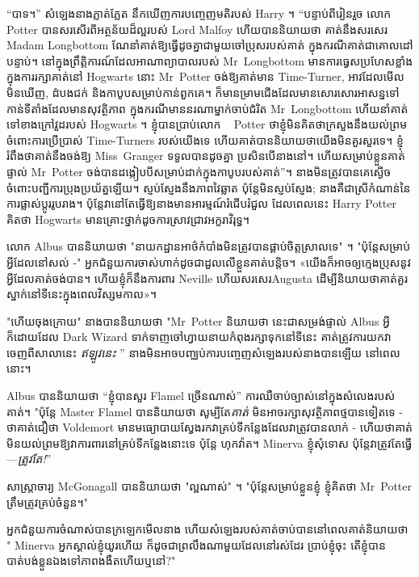“បាទ។” សំឡេង​នាង​ភ្លាត់​ភ្លែត នឹក​ឃើញ​ការ​បញ្ចេញ​មតិ​របស់ Harry ។ “បន្ទាប់ពីរៀនរួច លោក Potter បានសរសើរពីអត្ថន័យដ៏ល្អរបស់ Lord Malfoy ហើយបាននិយាយថា គាត់នឹងសរសេរ Madam Longbottom ណែនាំគាត់ឱ្យធ្វើដូចគ្នាជាមួយចៅប្រុសរបស់គាត់ ក្នុងករណីគាត់ជាគោលដៅបន្ទាប់។ នៅក្នុងព្រឹត្តិការណ៍ដែលអាណាព្យាបាលរបស់ Mr~Longbottom មានការធ្វេសប្រហែសខ្លាំងក្នុងការរក្សាគាត់នៅ Hogwarts នោះ Mr~Potter ចង់ឱ្យគាត់មាន Time-Turner, អាវដែលមើលមិនឃើញ, ដំបងជក់ និងកាបូបសម្រាប់កាន់ពួកគេ។ ក៏មានម្រាមជើងដែលមានសោរសោរអាសន្នទៅកាន់ទីតាំងដែលមានសុវត្ថិភាព ក្នុងករណីមាននរណាម្នាក់ចាប់ជំរិត Mr~Longbottom ហើយនាំគាត់ទៅខាងក្រៅវួដរបស់ Hogwarts ។ ខ្ញុំបានប្រាប់លោក ~ Potter ថាខ្ញុំមិនគិតថាក្រសួងនឹងយល់ព្រមចំពោះការប្រើប្រាស់ Time-Turners របស់យើងទេ ហើយគាត់បាននិយាយថាយើងមិនគួរសួរទេ។ ខ្ញុំរំពឹងថាគាត់នឹងចង់ឱ្យ Miss~Granger ទទួលបានដូចគ្នា ប្រសិនបើនាងនៅ។ ហើយសម្រាប់ខ្លួនគាត់ផ្ទាល់ Mr~Potter ចង់បានដង្កៀបបីសម្រាប់ដាក់ក្នុងកាបូបរបស់គាត់”។ នាង​មិន​ត្រូវ​បាន​គេ​ស្ងើច​ចំពោះ​បញ្ជី​ការ​ប្រុង​ប្រយ័ត្ន​ឡើយ។ ស្ញប់ស្ញែងនឹងភាពវៃឆ្លាត ប៉ុន្តែមិនស្ញប់ស្ញែង; នាងគឺជាស្រីកំណាន់នៃការផ្លាស់ប្តូររូបរាង។ ប៉ុន្តែវានៅតែធ្វើឱ្យនាងមានអារម្មណ៍រំជើបរំជួល ដែលពេលនេះ Harry Potter គិតថា Hogwarts មានគ្រោះថ្នាក់ដូចការស្រាវជ្រាវអក្ខរាវិរុទ្ធ។

លោក Albus បាននិយាយថា "នាយកដ្ឋានអាថ៌កំបាំងមិនត្រូវបានផ្គាប់ចិត្តស្រាលទេ" ។ "ប៉ុន្តែសម្រាប់អ្វីដែលនៅសល់ -" អ្នកជំនួយការចាស់ហាក់ដូចជាដួលលើខ្លួនគាត់បន្តិច។ «យើង​ក៏​អាច​ឲ្យ​ក្មេង​ប្រុស​នូវ​អ្វី​ដែល​គាត់​ចង់​បាន។ ហើយ​ខ្ញុំ​ក៏​នឹង​ការពារ Neville ហើយ​សរសេរ​ Augusta ដើម្បី​និយាយ​ថា​គាត់​គួរ​ស្នាក់​នៅ​ទី​នេះ​ក្នុង​ពេល​វិស្សមកាល»។

"ហើយចុងក្រោយ" នាងបាននិយាយថា "Mr~Potter និយាយថា នេះជាសម្រង់ផ្ទាល់ Albus អ្វីក៏ដោយដែល Dark Wizard ទាក់ទាញចៅហ្វាយនាយកំពុងរក្សាទុកនៅទីនេះ គាត់ត្រូវការយកវាចេញពីសាលានេះ \emph{ឥឡូវនេះ} ” នាង​មិន​អាច​បញ្ឈប់​ការ​បញ្ចេញ​សំឡេង​របស់​នាង​បាន​ឡើយ នៅ​ពេល​នោះ។

Albus បាននិយាយថា “ខ្ញុំបានសួរ Flamel ច្រើនណាស់” ការឈឺចាប់ច្បាស់នៅក្នុងសំលេងរបស់គាត់។ "ប៉ុន្តែ Master Flamel បាននិយាយថា សូម្បីតែ\emph{គាត់} មិនអាចរក្សាសុវត្ថិភាពថ្មបានទៀតទេ - ថាគាត់ជឿថា Voldemort មានមធ្យោបាយស្វែងរកវាគ្រប់ទីកន្លែងដែលវាត្រូវបានលាក់ - ហើយថាគាត់មិនយល់ព្រមឱ្យវាការពារនៅគ្រប់ទីកន្លែងនោះទេ ប៉ុន្តែ ហុកវ៉ាត។ Minerva ខ្ញុំសុំទោស ប៉ុន្តែវាត្រូវតែធ្វើ —\emph{ត្រូវតែ!}”

សាស្រ្តាចារ្យ McGonagall បាននិយាយថា "ល្អណាស់" ។ "ប៉ុន្តែសម្រាប់ខ្លួនខ្ញុំ ខ្ញុំគិតថា Mr~Potter ត្រឹមត្រូវគ្រប់ចំនួន។"

អ្នកជំនួយការចំណាស់បានក្រឡេកមើលនាង ហើយសំឡេងរបស់គាត់ចាប់បាននៅពេលគាត់និយាយថា " Minerva អ្នកស្គាល់ខ្ញុំយូរហើយ ក៏ដូចជាព្រលឹងណាមួយដែលនៅរស់ដែរ ប្រាប់ខ្ញុំចុះ តើខ្ញុំបានបាត់បង់ខ្លួនឯងទៅភាពងងឹតហើយឬនៅ?"

